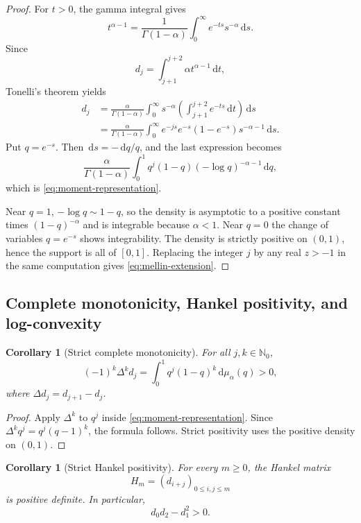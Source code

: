 \documentclass[11pt,oneside]{article}
\newtheorem{corollary}[theorem]{Corollary}
\theoremstyle{definition}
\theoremstyle{remark}
\newcommand{\Nzero}{\mathbb N_0}
\newcommand{\dd}{\,\mathrm d}
\begin{document}
\begin{proof}
For $t>0$, the gamma integral gives
\[
 t^{\alpha-1}
 =\frac1{\Gamma(1-\alpha)}
 \int_0^\infty e^{-ts}s^{-\alpha}\dd s.
\]
Since
\[
 d_j=\int_{j+1}^{j+2}\alpha t^{\alpha-1}\dd t,
\]
Tonelli's theorem yields
\begin{align*}
 d_j
 &=\frac{\alpha}{\Gamma(1-\alpha)}
   \int_0^\infty s^{-\alpha}
   \left(\int_{j+1}^{j+2}e^{-ts}\dd t\right)\dd s\\
 &=\frac{\alpha}{\Gamma(1-\alpha)}
   \int_0^\infty e^{-js}e^{-s}(1-e^{-s})s^{-\alpha-1}\dd s.
\end{align*}
Put $q=e^{-s}$.  Then $\dd s=-\dd q/q$, and the last expression becomes
\[
 \frac{\alpha}{\Gamma(1-\alpha)}
 \int_0^1q^j(1-q)(-\log q)^{-\alpha-1}\dd q,
\]
which is \eqref{eq:moment-representation}.

Near $q=1$, $-\log q\sim1-q$, so the density is asymptotic to a positive constant times
$(1-q)^{-\alpha}$ and is integrable because $\alpha<1$.  Near $q=0$ the change of variables
$q=e^{-s}$ shows integrability.  The density is strictly positive on $(0,1)$, hence the support
is all of $[0,1]$.  Replacing the integer $j$ by any real $z>-1$ in the same computation gives
\eqref{eq:mellin-extension}.
\end{proof}

\subsection{Complete monotonicity, Hankel positivity, and log-convexity}

\begin{corollary}[Strict complete monotonicity]\label{cor:complete-monotone}
For all $j,k\in\Nzero$,
\begin{equation}\label{eq:complete-monotone}
 (-1)^k\Delta^kd_j
 =\int_0^1q^j(1-q)^k\dd\mu_\alpha(q)>0,
\end{equation}
where $\Delta d_j=d_{j+1}-d_j$.
\end{corollary}

\begin{proof}
Apply $\Delta^k$ to $q^j$ inside \eqref{eq:moment-representation}.  Since
$\Delta^kq^j=q^j(q-1)^k$, the formula follows.  Strict positivity uses the positive density on
$(0,1)$.
\end{proof}

\begin{corollary}[Strict Hankel positivity]\label{cor:hankel}
For every $m\ge0$, the Hankel matrix
\[
 H_m=(d_{i+j})_{0\le i,j\le m}
\]
is positive definite.  In particular,
\begin{equation}\label{eq:first-hankel}
 d_0d_2-d_1^2>0.
\end{equation}
\end{corollary}
\end{document}
